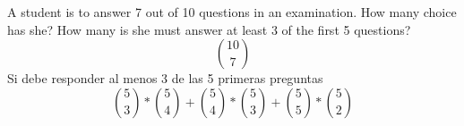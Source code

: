 \item A student is to answer 7 out of 10 questions in an examination. How many choice has she? How many is she must answer at least 3 of the first 5 questions?
\[ \binom{10}{7} \]
Si debe responder al menos 3 de las 5 primeras preguntas
\[ \binom{5}{3} * \binom{5}{4} + \binom{5}{4} * \binom{5}{3} + \binom{5}{5} * \binom{5}{2} \]